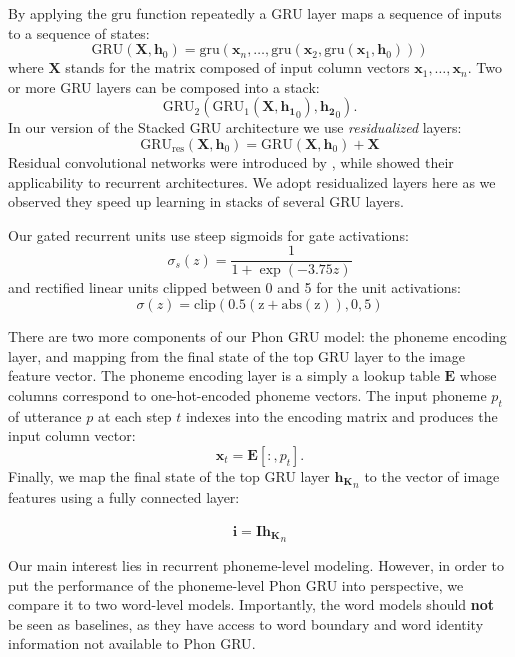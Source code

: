By applying the $\mathrm{gru}$ function repeatedly a GRU layer maps a
sequence of inputs to a sequence of states:
\begin{equation}
  \mathrm{GRU}(\mathbf{X}, \mathbf{h}_0) = \mathrm{gru}(\mathbf{x}_n, \dots, \mathrm{gru}(\mathbf{x}_2, \mathrm{gru}(\mathbf{x}_1, \mathbf{h}_0)))
\end{equation}
where $\mathbf{X}$ stands for the matrix composed of input column vectors
$\mathbf{x}_1, \ldots, \mathbf{x}_n$. Two or more GRU layers can be composed into a stack: 
\begin{equation}
\mathrm{GRU}_2(\mathrm{GRU}_1(\mathbf{X}, {\mathbf{h_1}}_{0}), {\mathbf{h_2}}_{0}).
\end{equation}
In our version of the Stacked GRU architecture we use {\it residualized} layers:
\begin{equation}
\mathrm{GRU_{res}}(\mathbf{X}, \mathbf{h}_0) = \mathrm{GRU}(\mathbf{X}, \mathbf{h}_0) + \mathbf{X}
\end{equation}
Residual convolutional networks were introduced by
, while  showed their
applicability to recurrent architectures. We adopt residualized layers
here as we observed they speed up learning in stacks of several
GRU layers.

Our gated recurrent units use steep sigmoids for gate activations: \[
\sigma_s(z) = \frac{1}{1 + \exp(-3.75z)} 
\]
and rectified linear units clipped between 0 and 5 for the unit
activations:
\[
\sigma(z) = \mathrm{clip(0.5(z+\mathrm{abs}(z)), 0, 5)}
\]

There are two more components of our {\sc Phon GRU} model: the
phoneme encoding layer, and mapping from the final state of the top GRU
layer to the image feature vector.
The phoneme encoding layer is a simply a lookup table $\mathbf{E}$ whose
columns correspond to one-hot-encoded phoneme vectors. The input
phoneme $p_t$ of utterance $p$ at each step $t$ indexes into the
encoding matrix and produces the input column vector:
\begin{equation}
  \mathbf{x}_t = \mathbf{E}[:,p_t].
\end{equation}
Finally, we map the final state of the top GRU layer ${\mathbf{h_K}}_n$
to the vector of image features using a fully connected layer:

\begin{equation}
  \hat{\mathbf{i}} = \mathbf{I} {\mathbf{h_K}}_n
\end{equation}

Our main interest lies in recurrent phoneme-level modeling. However, in order to
put the performance of the phoneme-level {\sc Phon GRU} into
perspective, we compare it to two word-level models. Importantly,
the word models should {\bf not} be seen as baselines, as they have access to
word boundary and word identity information not available to
{\sc Phon GRU}. 

